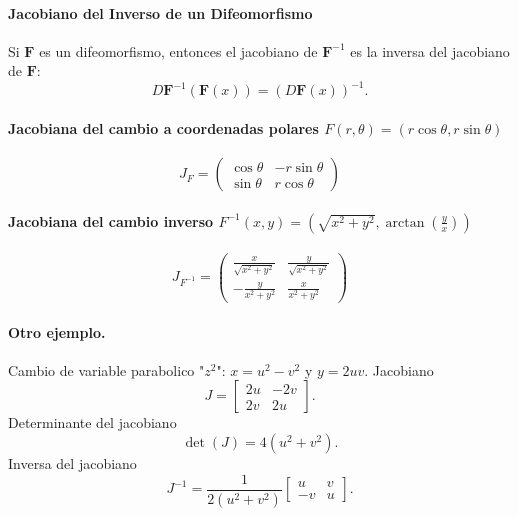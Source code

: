 \documentclass[11pt]{book}
\theoremstyle{definicion}
\theoremstyle{teorema}
\theoremstyle{ejemplo}
\begin{document}
\paragraph{Jacobiano del Inverso de un Difeomorfismo}
Si \( \mathbf{F} \) es un difeomorfismo, entonces el jacobiano de \( \mathbf{F}^{-1} \) es la inversa del jacobiano de \( \mathbf{F} \):
\[ D\mathbf{F}^{-1}(\mathbf{F}(x)) = (D\mathbf{F}(x))^{-1}. \]


\paragraph{Jacobiana del cambio a coordenadas polares \( F(r, \theta) = (r \cos \theta, r \sin \theta) \)}
\[
J_F = \begin{pmatrix}
\cos \theta & -r \sin \theta \\
\sin \theta & r \cos \theta
\end{pmatrix}
\]

\paragraph{Jacobiana del cambio inverso \( F^{-1}(x, y) = \left( \sqrt{x^2 + y^2}, \arctan\left(\frac{y}{x}\right) \right) \)}
\[
J_{F^{-1}} = \begin{pmatrix}
\frac{x}{\sqrt{x^2 + y^2}} & \frac{y}{\sqrt{x^2 + y^2}} \\
-\frac{y}{x^2 + y^2} & \frac{x}{x^2 + y^2}
\end{pmatrix}
\]


\paragraph{Otro ejemplo.} Cambio de variable parabolico "$z^2$":
$x=u^2-v^2$ y $y=2uv$.
Jacobiano
\[
J = \begin{bmatrix}
2u & -2v \\
2v & 2u
\end{bmatrix}.
\]
Determinante del jacobiano
\[
\det(J) = 4(u^2 + v^2).
\]
Inversa del jacobiano
\[
J^{-1} = \frac{1}{2(u^2 + v^2)} \begin{bmatrix}
u & v \\
-v & u
\end{bmatrix}.
\]

\end{document}
